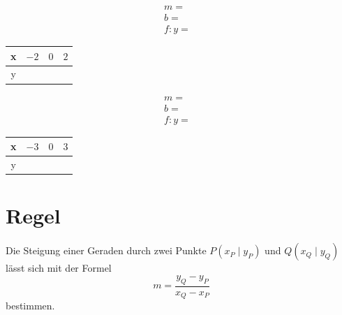 \documentclass[a4paper, DIV=13]{scrartcl}
\begin{document}
\begin{minipage}{0.5\linewidth}
\begin{align*}
m=& \\
b=& \\
f\colon y=
\end{align*}
\begin{center}
\begin{tabular}{|c|c|c|c|}
\hline
x & $-2$ & $0$ & $2$  \\
\hline
y &\qquad & \qquad & \qquad  \\
\hline
\end{tabular}
\end{center}

\end{minipage}
\begin{minipage}{0.5\linewidth}
\begin{align*}
m=& \\
b=& \\
f\colon y=
\end{align*}
\begin{center}
\begin{tabular}{|c|c|c|c|}
\hline
x & $-3$ & $0$ & $3$  \\
\hline
y &\qquad & \qquad & \qquad  \\
\hline
\end{tabular}
\end{center}
\end{minipage}

\section{Regel}

		Die Steigung einer Geraden durch zwei Punkte $P(x_P \mid y_P)$ und $Q(x_Q \mid y_Q)$ lässt sich mit der Formel $$m= \dfrac{{y_Q-y_P}}{{x_Q-x_P}}$$ bestimmen.
\end{document}

